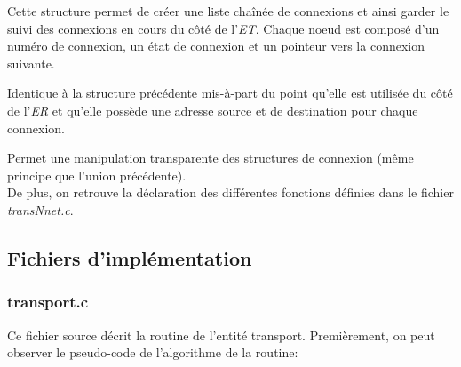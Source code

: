 \documentclass[11pt,french]{article}
\begin{document}
            
            Cette structure permet de créer une liste chaînée de connexions et ainsi garder le suivi des connexions en cours du côté de l'\emph{ET}. 
            Chaque noeud est composé d'un numéro de connexion, un état de connexion et un pointeur vers la connexion suivante.

            
            Identique à la structure précédente mis-à-part du point qu'elle est utilisée du côté de l'\emph{ER} et qu'elle possède une adresse source et
            de destination pour chaque connexion.

            
            Permet une manipulation transparente des structures de connexion (même principe que l'union précédente).\\

            De plus, on retrouve la déclaration des différentes fonctions définies dans le fichier \emph{transNnet.c}.
            

    \subsection{Fichiers d'implémentation} %
    \label{sub:fich-implementation-trans-entity}
        \subsubsection{transport.c} %
        \label{ssub:transport.c}
            Ce fichier source décrit la routine de l'entité transport. Premièrement, on peut observer le pseudo-code de l'algorithme de la routine:

\end{document}
